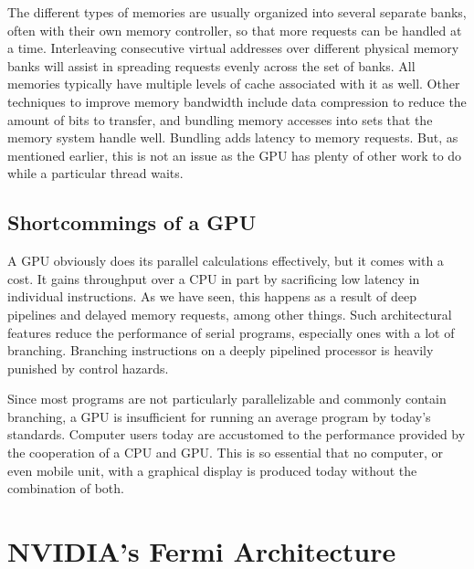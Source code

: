 \documentclass[../main/report.tex]{subfiles}
\begin{document}
The different types of memories are usually organized into several separate banks, often with their own memory controller, so that more requests can be handled at a time.
Interleaving consecutive virtual addresses over different physical memory banks will assist in spreading requests evenly across the set of banks. 
All memories typically have multiple levels of cache associated with it as well.
Other techniques to improve memory bandwidth include data compression to reduce the amount of bits to transfer, and bundling memory accesses into sets that the memory system handle well.
Bundling adds latency to memory requests.
But, as mentioned earlier, this is not an issue as the GPU has plenty of other work to do while a particular thread waits.

\section{Shortcommings of a GPU}


A GPU obviously does its parallel calculations effectively, but it comes with a cost.
It gains throughput over a CPU in part by sacrificing low latency in individual instructions.
As we have seen, this happens as a result of deep pipelines and delayed memory requests, among other things.
Such architectural features reduce the performance of serial programs, especially ones with a lot of branching.
Branching instructions on a deeply pipelined processor is heavily punished by control hazards.

Since most programs are not particularly parallelizable and commonly contain branching, a GPU is insufficient for running an average program by today's standards.
Computer users today are accustomed to the performance provided by the cooperation of a CPU and GPU.
This is so essential that no computer, or even mobile unit, with a graphical display is produced today without the combination of both.

\chapter{NVIDIA's Fermi Architecture}
\label{sec:fermi}

\end{document}
